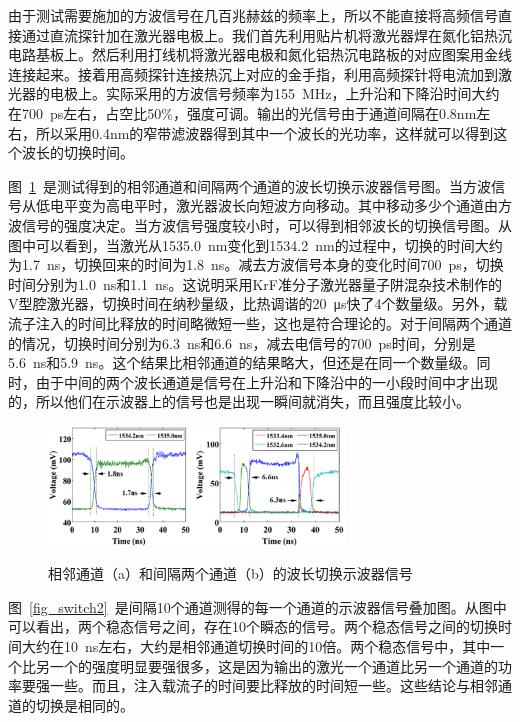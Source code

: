 \documentclass{ZJUthesis}
\begin{document}
由于测试需要施加的方波信号在几百兆赫兹的频率上，所以不能直接将高频信号直接通过直流探针加在激光器电极上。我们首先利用贴片机将激光器焊在氮化铝热沉电路基板上。然后利用打线机将激光器电极和氮化铝热沉电路板的对应图案用金线连接起来。接着用高频探针连接热沉上对应的金手指，利用高频探针将电流加到激光器的电极上。实际采用的方波信号频率为155~MHz，上升沿和下降沿时间大约在700~ps左右，占空比50\%，强度可调。输出的光信号由于通道间隔在0.8nm左右，所以采用0.4nm的窄带滤波器得到其中一个波长的光功率，这样就可以得到这个波长的切换时间。

图~\ref{fig_switch}~是测试得到的相邻通道和间隔两个通道的波长切换示波器信号图。当方波信号从低电平变为高电平时，激光器波长向短波方向移动。其中移动多少个通道由方波信号的强度决定。当方波信号强度较小时，可以得到相邻波长的切换信号图。从图中可以看到，当激光从1535.0~nm变化到1534.2~nm的过程中，切换的时间大约为1.7~ns，切换回来的时间为1.8~ns。减去方波信号本身的变化时间700~ps，切换时间分别为1.0~ns和1.1~ns。这说明采用KrF准分子激光器量子阱混杂技术制作的V型腔激光器，切换时间在纳秒量级，比热调谐的20~μs快了4个数量级。另外，载流子注入的时间比释放的时间略微短一些，这也是符合理论的。对于间隔两个通道的情况，切换时间分别为6.3~ns和6.6~ns，减去电信号的700~ps时间，分别是5.6~ns和5.9~ns。这个结果比相邻通道的结果略大，但还是在同一个数量级。同时，由于中间的两个波长通道是信号在上升沿和下降沿中的一小段时间中才出现的，所以他们在示波器上的信号也是出现一瞬间就消失，而且强度比较小。

\begin{figure}[htbp]
  \centering
  \includegraphics[width=0.7\textwidth]{./Pictures/switch.eps}\\
  \caption{相邻通道（a）和间隔两个通道（b）的波长切换示波器信号}
  \label{fig_switch}
\end{figure}

图~\ref{fig_switch2}~是间隔10个通道测得的每一个通道的示波器信号叠加图。从图中可以看出，两个稳态信号之间，存在10个瞬态的信号。两个稳态信号之间的切换时间大约在10~ns左右，大约是相邻通道切换时间的10倍。两个稳态信号中，其中一个比另一个的强度明显要强很多，这是因为输出的激光一个通道比另一个通道的功率要强一些。而且，注入载流子的时间要比释放的时间短一些。这些结论与相邻通道的切换是相同的。
\end{document}
